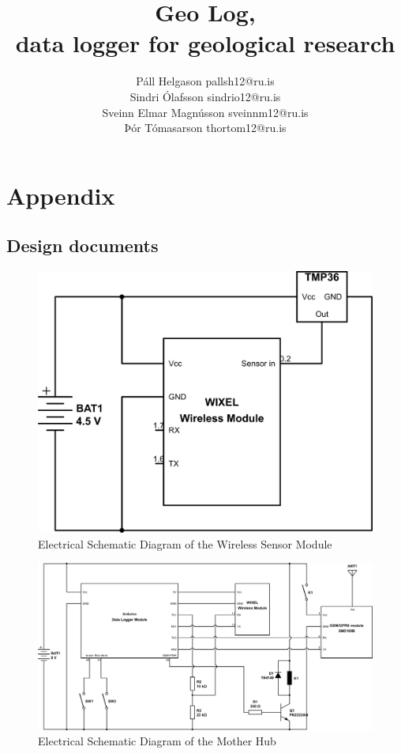 \documentclass[12pt, svn, draft]{rureport}
\author{Páll Helgason pallsh12@ru.is\\Sindri Ólafsson sindrio12@ru.is\\Sveinn Elmar Magnússon sveinnm12@ru.is\\Þór Tómasarson thortom12@ru.is}  %
\title{Geo Log,\\ \large{data logger for geological research}}  %
\begin{document}
\maketitle  %
\tableofcontents
\pagebreak


\pagebreak








\pagebreak
{}



\pagebreak
{}
\section*{Appendix}
\subsection*{Design documents}

\begin{figure}[H]
\centering
\includegraphics[width=0.5\linewidth]{graphics/sensormodule_schematic}
\caption{Electrical Schematic Diagram of the Wireless Sensor Module\label{fig:sensormodule_schematic}}
\end{figure}

\begin{figure}[H]
\centering
\includegraphics[width=1\linewidth]{graphics/motherhub_schematic}
\caption{Electrical Schematic Diagram of the Mother Hub\label{fig:motherhub_schematic}}
\end{figure}
\end{document}
